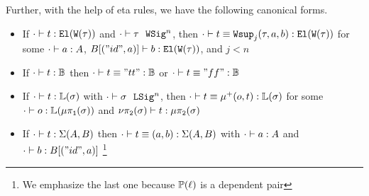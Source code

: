 Further, with the help of eta rules, we have the following canonical forms.
\begin{theorem}\hfill
  \begin{itemize}
    \item If $ {\cdot} \vdash {t} : {\texttt{El}({\texttt{W}({\tau})})} $ and $ {\cdot} \vdash {\tau} \ \ \texttt{WSig}^{n} $, then $ {\cdot} \vdash {t \equiv \ensuremath{\texttt{Wsup}_{j}({\tau},{a},{b})}} : {\texttt{El}({\texttt{W}({\tau})})} $ for some $ {\cdot} \vdash {a} : {A} $, $ {B[("id", a)]} \vdash {b} : {\texttt{El}({\texttt{W}({\tau})})} $, and $j < n$
    \item If $ {\cdot} \vdash {t} : {\mathbb{B}} $ then $ {\cdot} \vdash {t \equiv "tt"} : {\mathbb{B}} $ or $ {\cdot} \vdash {t \equiv "ff"} : {\mathbb{B}} $ 
    \item If $ {\cdot} \vdash {t} : {\mathbb{L}({\sigma})} $ with $ {\cdot} \vdash {\sigma} \ \ \texttt{LSig}^{n} $, then $ {\cdot} \vdash {t \equiv \ensuremath{\mu^+({o},{t})}} : {\mathbb{L}({\sigma})} $ 
      for some $ {\cdot} \vdash {o} : {\mathbb{L}({\mu\pi_{\texttt{1}}({\sigma})})} $ and $ {\nu\pi_{\texttt{2}}({\sigma})} \vdash {t} : {\mu\pi_{\texttt{2}}({\sigma})} $
    \item If $ {\cdot} \vdash {t} : {\Sigma({A},{B})} $ then $ {\cdot} \vdash {t \equiv (a, b)} : {\Sigma({A},{B})} $ with $ {\cdot} \vdash {a} : {A} $ and $ {\cdot} \vdash {b} : {B[("id", a)]} $
    \footnote{We emphasize the last one because $\mathbb{P}({\ell})$ is a dependent pair}
  \end{itemize}
\end{theorem}

